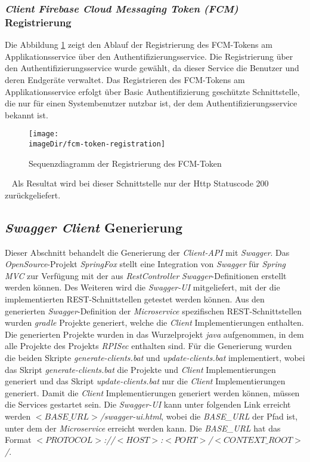 \documentclass[]{article}
\newcommand{\imageDir}{images}
\begin{document}
{{{{\subsubsection{\emph{Client} \emph{Firebase Cloud Messaging Token (FCM)} Registrierung}
Die Abbildung \ref{fig:image-sequence-fcm-token-registration} zeigt den Ablauf der Registrierung des FCM-Tokens am Applikationsservice über den Authentifizierungsservice. Die Registrierung über den Authentifizierungsservice wurde gewählt, da dieser Service die Benutzer und deren Endgeräte verwaltet. Das Registrieren des FCM-Tokens am Applikationsservice erfolgt über Basic Authentifizierung geschützte Schnittstelle, die nur für einen Systembenutzer nutzbar ist, der dem Authentifizierungsservice bekannt ist. 
\newpage
\begin{figure}[h]
	\centering
	\texttt{[image: \\imageDir/fcm-token-registration]}
	\caption{Sequenzdiagramm der Registrierung des FCM-Token}
	\label{fig:image-sequence-fcm-token-registration}
\end{figure}
\ \newline
Als Resultat wird bei dieser Schnittstelle nur der Http Statuscode 200 zurückgeliefert.

\subsection{\emph{Swagger Client} Generierung}
\label{sec:swagger-client-generation}
Dieser Abschnitt behandelt die Generierung der \emph{Client-API} mit \emph{Swagger}. Das \emph{OpenSource}-Projekt \emph{SpringFox} stellt eine Integration von \emph{Swagger} für \emph{Spring MVC} zur Verfügung mit der aus \emph{RestController} \emph{Swagger}-Definitionen erstellt werden können. Des Weiteren wird die \emph{Swagger-UI} mitgeliefert, mit der die implementierten REST-Schnittstellen getestet werden können.
\newline
\newline
Aus den generierten \emph{Swagger}-Definition der \emph{Microservice} spezifischen REST-Schnittstellen wurden \emph{gradle} Projekte generiert, welche die \emph{Client} Implementierungen enthalten. Die generierten Projekte wurden in das Wurzelprojekt \emph{java} aufgenommen, in dem alle Projekte des Projekts \emph{RPISec} enthalten sind.
\newline
\newline
Für die Generierung wurden die beiden Skripte \emph{generate-clients.bat} und \emph{update-clients.bat} implementiert, wobei das Skript \emph{generate-clients.bat} die Projekte und \emph{Client} Implementierungen generiert und das Skript \emph{update-clients.bat} nur die \emph{Client} Implementierungen generiert. Damit die \emph{Client} Implementierungen generiert werden können, müssen die Services gestartet sein.
\newline
\newline
Die \emph{Swagger-UI} kann unter folgenden Link erreicht werden \emph{$<BASE\_URL>$/swagger-ui.html}, wobei die \emph{BASE\_URL} der Pfad ist, unter dem der \emph{Microservice} erreicht werden kann. Die \emph{BASE\_URL} hat das Format \emph{$<PROTOCOL>$://$<HOST>$:$<PORT>$/$<CONTEXT\_ROOT>$/}. 
\newpage

}}}}
\end{document}
